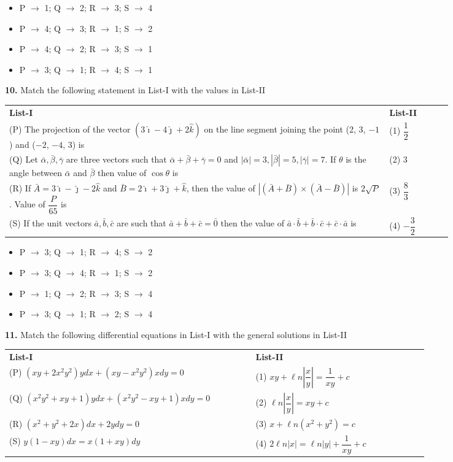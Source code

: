 \documentclass[10pt,twocolumn]{extarticle}
\renewcommand{\arraystretch}{1.15}
\newenvironment{qoptions}{\begin{itemize}[leftmargin=1.8em,itemsep=2pt,topsep=2pt,label={}]}{\end{itemize}}
\newcommand{\opt}[2]{\item[({#1})] {#2}}
\begin{document}
\begin{qoptions}
\opt{A}{P $\to$ 1; Q $\to$ 2; R $\to$ 3; S $\to$ 4}
\opt{B}{P $\to$ 4; Q $\to$ 3; R $\to$ 1; S $\to$ 2}
\opt{C}{P $\to$ 4; Q $\to$ 2; R $\to$ 3; S $\to$ 1}
\opt{D}{P $\to$ 3; Q $\to$ 1; R $\to$ 4; S $\to$ 1}
\end{qoptions}


\textbf{10.} Match the following statement in List-I with the values in List-II

\begin{center}
\renewcommand{\arraystretch}{1.5}
\begin{tabular}{@{}p{0.72\linewidth}p{0.12\linewidth}@{}}
\textbf{List-I} & \textbf{List-II}\\
(P) The projection of the vector $(3\hat\imath-4\hat\jmath+2\hat k)$ on the line segment joining the point (2, 3, $-1$) and ($-2$, $-4$, 3) is & (1) $\dfrac12$\\
(Q) Let $\bar\alpha,\bar\beta,\bar\gamma$ are three vectors such that $\bar\alpha+\bar\beta+\bar\gamma=0$ and $|\bar\alpha|=3,|\bar\beta|=5,|\bar\gamma|=7$. If $\theta$ is the angle between $\bar\alpha$ and $\bar\beta$ then value of $\cos\theta$ is & (2) 3\\
(R) If $\bar A=3\hat\imath-\hat\jmath-2\hat k$ and $\bar B=2\hat\imath+3\hat\jmath+\hat k$, then the value of $\left|(\bar A+\bar B)\times(\bar A-\bar B)\right|$ is $2\sqrt P$. Value of $\dfrac{P}{65}$ is & (3) $\dfrac83$\\
(S) If the unit vectors $\bar a,\bar b,\bar c$ are such that $\bar a+\bar b+\bar c=\bar0$ then the value of $\bar a\cdot\bar b+\bar b\cdot\bar c+\bar c\cdot\bar a$ is & (4) $-\dfrac32$\\
\end{tabular}
\renewcommand{\arraystretch}{1.15}
\end{center}

\begin{qoptions}
\opt{A}{P $\to$ 3; Q $\to$ 1; R $\to$ 4; S $\to$ 2}
\opt{B}{P $\to$ 3; Q $\to$ 4; R $\to$ 1; S $\to$ 2}
\opt{C}{P $\to$ 1; Q $\to$ 2; R $\to$ 3; S $\to$ 4}
\opt{D}{P $\to$ 3; Q $\to$ 1; R $\to$ 2; S $\to$ 4}
\end{qoptions}

\textbf{11.} Match the following differential equations in List-I with the general solutions in List-II

\begin{center}
\renewcommand{\arraystretch}{1.5}
\begin{tabular}{@{}p{0.5\linewidth}p{0.35\linewidth}@{}}
\textbf{List-I} & \textbf{List-II}\\
(P) $(xy+2x^2y^2)ydx+(xy-x^2y^2)xdy=0$ & (1) $xy+\ell n\left|\dfrac xy\right|=\dfrac1{xy}+c$\\
(Q) $(x^2y^2+xy+1)ydx+(x^2y^2-xy+1)xdy=0$ & (2) $\ell n\left|\dfrac xy\right|=xy+c$\\
(R) $(x^2+y^2+2x)dx+2ydy=0$ & (3) $x+\ell n(x^2+y^2)=c$\\
(S) $y(1-xy)dx=x(1+xy)dy$ & (4) $2\ell n|x|=\ell n|y|+\dfrac1{xy}+c$\\
\end{tabular}
\renewcommand{\arraystretch}{1.15}
\end{center}
\end{document}
